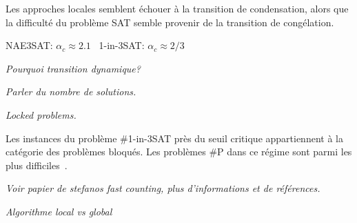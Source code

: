 Les approches locales semblent échouer à la transition de condensation, alors que la difficulté du problème SAT semble provenir de la transition de congélation.


NAE3SAT: $\alpha_{c} \approx 2.1$~\cite{achlioptasPhaseTransition1ink2001}
1-in-3SAT: $\alpha_{c} \approx 2/3$~\cite{raymondPhaseDiagram1in32007}

\textcolor{mydarkred}{\textit{Pourquoi transition dynamique?}}

\textcolor{mydarkred}{\textit{Parler du nombre de solutions.}}

\textcolor{mydarkred}{\textit{Locked problems.}}

Les instances du problème \#1-in-3SAT près du seuil critique appartiennent à la catégorie des problèmes bloqués. Les problèmes \#P dans ce régime sont parmi les plus difficiles~\cite{zdeborovaStatisticalPhysicsHard2008}.

\textcolor{mydarkred}{\textit{Voir papier de stefanos fast counting, plus d'informations et de références.}}

\textcolor{mydarkred}{\textit{Algorithme local vs global}}